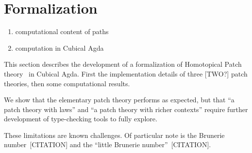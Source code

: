\chapter{Formalization}

\begin{enumerate}
\item computational content of paths~\cite{Angiuli2016}
\item computation in Cubical Agda~\cite{vezzosi2021cubical, Angiuli2016}
\end{enumerate}

This section describes the development of a formalization of Homotopical Patch
theory~\cite{Angiuli2016} in Cubical Agda. First the implementation details of
three [TWO?] patch theories, then some computational results.

We show that the elementary patch theory performs as expected, but that ``a
patch theory with laws'' and ``a patch theory with richer contexts'' require
further development of type-checking tools to fully explore.

These limitations are known challenges. Of particular note is the Brunerie
number~[CITATION] and the ``little Brunerie number''~[CITATION].